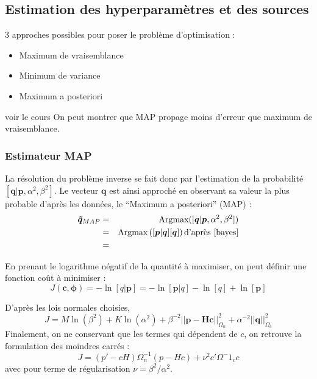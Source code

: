 \subsection{Estimation des hyperparamètres et des sources}
3 approches possibles pour poser le problème d'optimisation : 
\begin{itemize}
	\item Maximum de vraisemblance\\
	\item Minimum de variance\\
	\item Maximum a posteriori\\
\end{itemize}
voir le cours %
On peut montrer que MAP propage moins d'erreur que maximum de vraisemblance.
\subsubsection{Estimateur MAP}
La résolution du problème inverse se fait donc par l'estimation de la probabilité $[\bm{q}|\bm{p},\alpha^2,\beta^2]$. Le vecteur $\bm{q}$ est ainsi approché en observant sa valeur la plus probable d'après les données, le  ``Maximum a posteriori'' (MAP) : 
\begin{eqnarray}
\bm{\tilde{q}}_{MAP} &=& \text{Argmax}([\bm{q}|\bm{p},\alpha^2,\beta^2])\\
					 &=& \text{Argmax}\left( [\bm{p}|\bm{q}][\bm{q}]  \right) \text{d'après \ref{bayes}}\\
					 &=& 
\end{eqnarray}

En prenant le logarithme négatif de la quantité à maximiser, on peut définir une fonction coût à minimiser : 
\begin{equation}
	J(\bm{c},\bm{\phi}) = - \ln[q|\bm{p}] = -\ln[\bm{p}|q]-\ln[q]+\ln[\bm{p}]
\end{equation}

D'après les lois normales choisies, 
\begin{equation}
J=M\ln(\beta^2) + K\ln(\alpha^2) +\beta^{-2}||\bm{p}-\bm{Hc}||^2_{\Omega_n}+\alpha^{-2}||\bm{q}||^2_{\Omega_c}
\end{equation}
Finalement, on ne conservant que les termes qui dépendent de $c$, on retrouve la formulation des moindres carrés : 
\begin{equation}
 J = (p'-cH)\Omega^{-1}_n(p-Hc) + \nu^2c'\Omega^-1_c c
\end{equation}
avec pour terme de régularisation $\nu = \beta^2/\alpha^2$.





